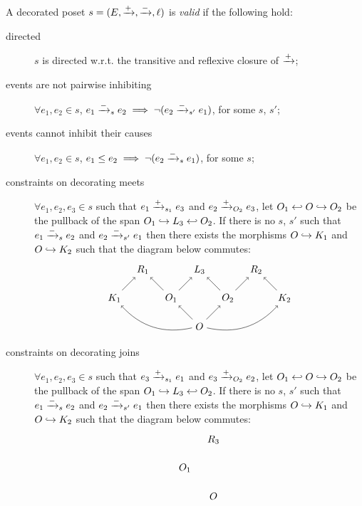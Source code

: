 \begin{definition}
  \label{def:constraints_poset}
  A decorated poset $s = (E,\mathrel{\xrightarrow{+}},\mathrel{\xrightarrow{-}},\ell)$ is \emph{valid} if the following hold:
  \begin{description}
  \item[directed]
    $s$ is directed w.r.t. the transitive and reflexive closure of $\mathrel{\xrightarrow{+}}$;
  \item[events are not pairwise inhibiting]
    $\forall e_1,e_2\in s$, $e_1\mathrel{\xrightarrow{-}}_s e_2\implies \neg(e_2 \mathrel{\xrightarrow{-}}_{s'} e_1)$, for some $s$, $s'$;
  \item[events cannot inhibit their causes]
    $\forall e_1,e_2\in s$, $e_1\leq e_2\implies \neg(e_2 \mathrel{\xrightarrow{-}}_{s} e_1)$, for some $s$;
  \item[constraints on decorating meets]
    $\forall e_1,e_2,e_3\in s$ such that $e_1\mathrel{\xrightarrow{+}}_{s_1} e_3$ and $e_2\mathrel{\xrightarrow{+}}_{O_2} e_3$, let $O_1\hookleftarrow O\hookrightarrow O_2$ be the pullback of the span $O_1\hookrightarrow L_3 \hookleftarrow O_2$.
If there is no $s$, $s'$ such that $e_1\mathrel{\xrightarrow{-}}_s e_2$ and $e_2\mathrel{\xrightarrow{-}}_{s'} e_1$ then there exists the morphisms $O\hookrightarrow K_1$ and $O\hookrightarrow K_2$ such that the diagram below commutes:
    \[
    \begin{tikzpicture} %
      \node (o) at (0,-1) {\(O\)};
      \node (r3) at (0,1) {\(L_3\)};
      \node (o1) at (-1,0) {\(O_1\)};
      \node (o2) at (1,0) {\(O_2\)};
      \node (r1) at (-2,1) {\(R_1\)};
      \node (r2) at (2,1) {\(R_2\)};
      \node (k1) at (-3,0) {\(K_1\)};
      \node (k2) at (3,0) {\(K_2\)};
      \draw [->] (o) -- (o1);
      \draw [->] (o) -- (o2);
      \draw [->] (o1) -- (r3);
      \draw [->] (o2) -- (r3);
      \draw [->] (o1) -- (r1);
      \draw [->] (o2) -- (r2);
      \draw [->] (k1) -- (r1);
      \draw [->] (k2) -- (r2);
      \draw [->] (o) to [bend left] (k1);
      \draw [->] (o) to [bend right] (k2);
    \end{tikzpicture}
    \]
  \item[constraints on decorating joins]
    $\forall e_1,e_2,e_3\in s$ such that $e_3\mathrel{\xrightarrow{+}}_{s_1} e_1$ and $e_3\mathrel{\xrightarrow{+}}_{O_2} e_2$, let $O_1\hookleftarrow O\hookrightarrow O_2$ be the pullback of the span $O_1\hookrightarrow L_3 \hookleftarrow O_2$.
    If there is no $s$, $s'$ such that $e_1\mathrel{\xrightarrow{-}}_s e_2$ and $e_2\mathrel{\xrightarrow{-}}_{s'} e_1$ then there exists the morphisms $O\hookrightarrow K_1$ and $O\hookrightarrow K_2$ such that the diagram below commutes:
       \[
    \begin{tikzpicture} %
      \node (o) at (0,-1) {\(O\)};
      \node (r3) at (0,1) {\(R_3\)};
      \node (o1) at (-1,0) {\(O_1\)};

\end{tikzpicture}\]
\end{description}
\end{definition}
